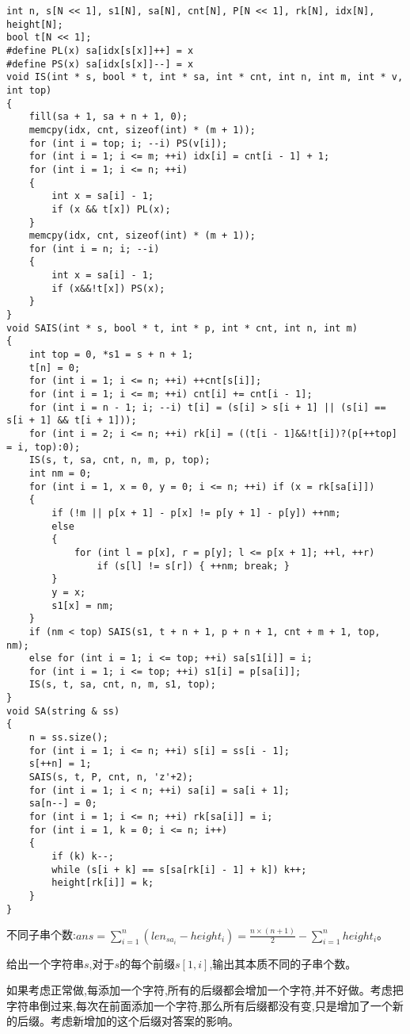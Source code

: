 \documentclass[a4paper, fontset=none]{ctexart}
\begin{document}
\begin{verbatim}
int n, s[N << 1], s1[N], sa[N], cnt[N], P[N << 1], rk[N], idx[N], height[N];
bool t[N << 1];
#define PL(x) sa[idx[s[x]]++] = x
#define PS(x) sa[idx[s[x]]--] = x
void IS(int * s, bool * t, int * sa, int * cnt, int n, int m, int * v, int top)
{
    fill(sa + 1, sa + n + 1, 0);
    memcpy(idx, cnt, sizeof(int) * (m + 1));
    for (int i = top; i; --i) PS(v[i]);
    for (int i = 1; i <= m; ++i) idx[i] = cnt[i - 1] + 1;
    for (int i = 1; i <= n; ++i)
    {
        int x = sa[i] - 1;
        if (x && t[x]) PL(x);
    }
    memcpy(idx, cnt, sizeof(int) * (m + 1));
    for (int i = n; i; --i)
    {
        int x = sa[i] - 1;
        if (x&&!t[x]) PS(x);
    }
}
void SAIS(int * s, bool * t, int * p, int * cnt, int n, int m)
{
    int top = 0, *s1 = s + n + 1;
    t[n] = 0;
    for (int i = 1; i <= n; ++i) ++cnt[s[i]];
    for (int i = 1; i <= m; ++i) cnt[i] += cnt[i - 1];
    for (int i = n - 1; i; --i) t[i] = (s[i] > s[i + 1] || (s[i] == s[i + 1] && t[i + 1]));
    for (int i = 2; i <= n; ++i) rk[i] = ((t[i - 1]&&!t[i])?(p[++top] = i, top):0);
    IS(s, t, sa, cnt, n, m, p, top);
    int nm = 0;
    for (int i = 1, x = 0, y = 0; i <= n; ++i) if (x = rk[sa[i]])
    {
        if (!m || p[x + 1] - p[x] != p[y + 1] - p[y]) ++nm;
        else
        {
            for (int l = p[x], r = p[y]; l <= p[x + 1]; ++l, ++r)
                if (s[l] != s[r]) { ++nm; break; }
        }
        y = x;
        s1[x] = nm;
    }
    if (nm < top) SAIS(s1, t + n + 1, p + n + 1, cnt + m + 1, top, nm);
    else for (int i = 1; i <= top; ++i) sa[s1[i]] = i;
    for (int i = 1; i <= top; ++i) s1[i] = p[sa[i]];
    IS(s, t, sa, cnt, n, m, s1, top);
}
void SA(string & ss)
{
    n = ss.size();
    for (int i = 1; i <= n; ++i) s[i] = ss[i - 1];
    s[++n] = 1;
    SAIS(s, t, P, cnt, n, 'z'+2);
    for (int i = 1; i < n; ++i) sa[i] = sa[i + 1];
    sa[n--] = 0;
    for (int i = 1; i <= n; ++i) rk[sa[i]] = i;
    for (int i = 1, k = 0; i <= n; i++)
    {
        if (k) k--;
        while (s[i + k] == s[sa[rk[i] - 1] + k]) k++;
        height[rk[i]] = k;
    }
}
\end{verbatim}

不同子串个数:$ans=\sum\limits_{i=1}^n{(len_{sa_i}-height_i)}=\frac{n\times (n+1)}{2}-\sum\limits_{i=1}^n height_i$。

给出一个字符串$s$,对于$s的每个前缀s[1, i]$,输出其本质不同的子串个数。

如果考虑正常做,每添加一个字符,所有的后缀都会增加一个字符,并不好做。考虑把字符串倒过来,每次在前面添加一个字符,那么所有后缀都没有变,只是增加了一个新的后缀。考虑新增加的这个后缀对答案的影响。
\end{document}
